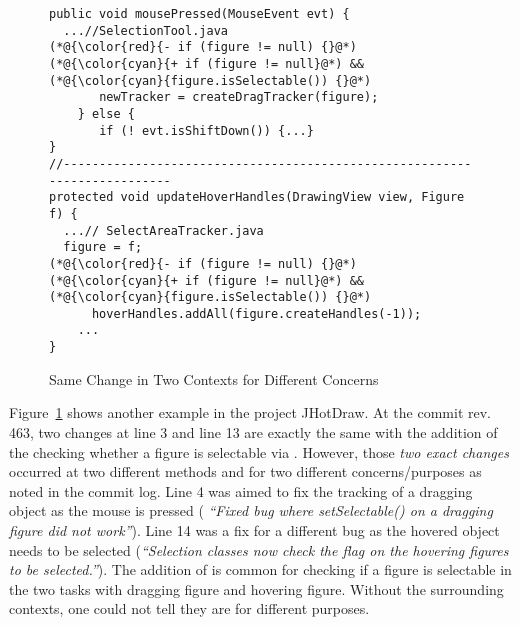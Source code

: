 \begin{figure}[t]
	\centering
	\begin{lstlisting}[]
public void mousePressed(MouseEvent evt) { 
  ...//SelectionTool.java
(*@{\color{red}{- if (figure != null) {}@*)
(*@{\color{cyan}{+ if (figure != null}@*) && (*@{\color{cyan}{figure.isSelectable()) {}@*)
       newTracker = createDragTracker(figure);
    } else {
       if (! evt.isShiftDown()) {...}
}
//--------------------------------------------------------------------------
protected void updateHoverHandles(DrawingView view, Figure f) {
  ...// SelectAreaTracker.java
  figure = f;
(*@{\color{red}{- if (figure != null) {}@*)
(*@{\color{cyan}{+ if (figure != null}@*) && (*@{\color{cyan}{figure.isSelectable()) {}@*)
      hoverHandles.addAll(figure.createHandles(-1));
    ...
}
	\end{lstlisting}
        \vspace{-15pt}
        \caption{Same Change in Two Contexts for Different Concerns}
        \vspace{-6pt}
        \label{fig:motiv-context}
\end{figure}

Figure~\ref{fig:motiv-context} shows another example in the project
JHotDraw. At the commit rev. 463, two changes at line 3 and line 13
are exactly the same with the addition of the checking whether a
figure is selectable via . However, those
{\em two exact changes} occurred at two different methods
 and  for two different
concerns/purposes as noted in the commit log. Line 4 was aimed to fix
the tracking of a dragging object as the mouse is pressed ({\em
  ``Fixed bug where setSelectable() on a dragging figure did not
  work''}).  Line 14 was a fix for a different bug as the hovered
object needs to be selected ({\em ``Selection classes now check the
  flag on the hovering figures to be selected.''}). The addition of
 is common for checking if a figure is
selectable in the two tasks with dragging figure and hovering
figure. Without the surrounding contexts, one could not tell they are
for different purposes.

